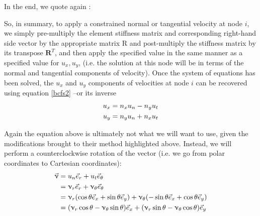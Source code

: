 In the end, we quote again \cite{ensg82}:
\begin{displayquote}
{\color{darkgray}
So, in summary, to apply a constrained normal or tangential velocity at node $i$, we simply
pre-multiply the element stiffness matrix and corresponding right-hand side vector by the
appropriate matrix R and post-multiply the stiffness matrix by its transpose ${\bm R}^T$, and then
apply the specified value in the same manner as a specified value for $u_x,u_y$, (i.e. the solution
at this node will be in terms of the normal and tangential components of velocity). Once the
system of equations has been solved, the $u_x$ and $u_y$ components of velocities at node $i$ can be
recovered using equation \eqref{bcfs2} --or its inverse 
\begin{align}
u_x &= n_x u_n - n_y u_t \nonumber\\
u_y &= n_y u_n + n_x u_t
\end{align}
}
\end{displayquote}
Again the equation above is ultimately not what we will want to use, given the modifications 
brought to their method highlighted above.
Instead, we will perform a counterclockwise rotation of the vector (i.e. we go from polar coordinates to 
Cartesian coordinates):
\begin{align}
\vec\upnu 
&= u_n \vec{e}_r + u_t \vec{e}_\theta \nonumber\\
&= \upnu_r \vec{e}_r + \upnu_\theta \vec{e}_\theta \nonumber\\
&= \upnu_r (\cos\theta \vec{e}_x + \sin\theta \vec{e}_y)
+ \upnu_\theta (-\sin\theta \vec{e}_x + \cos\theta \vec{e}_y) \nonumber\\
&= (\upnu_r \cos\theta - \upnu_\theta \sin\theta ) \vec{e}_x
+ (\upnu_r \sin\theta - \upnu_\theta \cos\theta ) \vec{e}_y \label{fsbc4}
\end{align}



